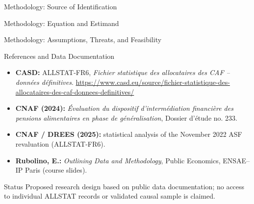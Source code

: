 \documentclass[aspectratio=169,10pt]{beamer}
\begin{document}
\begin{frame}{Methodology: Source of Identification}

\end{frame}

\begin{frame}{Methodology: Equation and Estimand}

\end{frame}

\begin{frame}{Methodology: Assumptions, Threats, and Feasibility}

\end{frame}

\begin{frame}{References and Data Documentation}
\small
\begin{itemize}\setlength{\itemsep}{0.32cm}
\item \textbf{CASD:} ALLSTAT-FR6, \emph{Fichier statistique des allocataires des CAF -- donn\'ees d\'efinitives}. \url{https://www.casd.eu/source/fichier-statistique-des-allocataires-des-caf-donnees-definitives/}
\item \textbf{CNAF (2024):} \emph{\'Evaluation du dispositif d'interm\'ediation financi\`ere des pensions alimentaires en phase de g\'en\'eralisation}, Dossier d'\'etude no. 233.
\item \textbf{CNAF / DREES (2025):} statistical analysis of the November 2022 ASF revaluation (ALLSTAT-FR6).
\item \textbf{Rubolino, E.:} \emph{Outlining Data and Methodology}, Public Economics, ENSAE--IP Paris (course slides).
\end{itemize}
\vspace{0.4cm}
\begin{block}{Status}
Proposed research design based on public data documentation; no access to individual ALLSTAT records or validated causal sample is claimed.
\end{block}
\end{frame}
\end{document}
